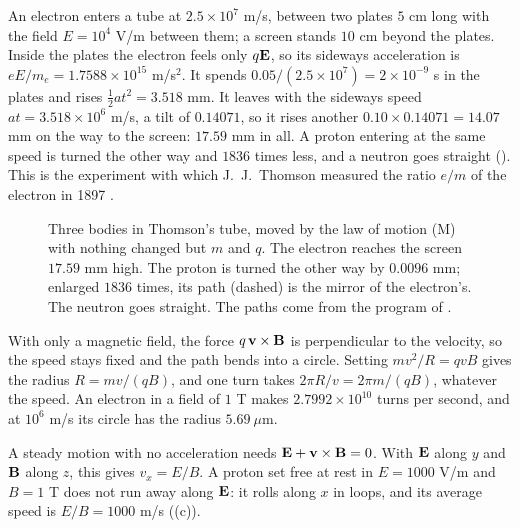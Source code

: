 \begin{workedexample}
An electron enters a tube at $2.5 \times 10^7$ m/s, between two plates $5$ cm long with the field $E = 10^4$ V/m between them; a screen stands $10$ cm beyond the plates. Inside the plates the electron feels only $q\mathbf{E}$, so its sideways acceleration is $eE/m_e = 1.7588 \times 10^{15}$ m/s$^2$. It spends $0.05/(2.5 \times 10^7) = 2 \times 10^{-9}$ s in the plates and rises $\tfrac12 a t^2 = 3.518$ mm. It leaves with the sideways speed $at = 3.518 \times 10^6$ m/s, a tilt of $0.14071$, so it rises another $0.10 \times 0.14071 = 14.07$ mm on the way to the screen: $17.59$ mm in all. A proton entering at the same speed is turned the other way and $1836$ times less, and a neutron goes straight (). This is the experiment with which J.~J.~Thomson measured the ratio $e/m$ of the electron in 1897 \citep{Thomson1897}.
\end{workedexample}

\begin{figure}[tb]
\myfloatalign

\caption[Three bodies in Thomson's tube]{Three bodies in Thomson's tube, moved by the law of motion (M) with nothing changed but $m$ and $q$. The electron reaches the screen $17.59$ mm high. The proton is turned the other way by $0.0096$ mm; enlarged $1836$ times, its path (dashed) is the mirror of the electron's. The neutron goes straight. The paths come from the program of .}
\label{fig:un-thomson}
\end{figure}

\begin{workedexample}
With only a magnetic field, the force $q\,\mathbf{v}\times\mathbf{B}$ is perpendicular to the velocity, so the speed stays fixed and the path bends into a circle. Setting $mv^2/R = qvB$ gives the radius $R = mv/(qB)$, and one turn takes $2\pi R/v = 2\pi m/(qB)$, whatever the speed. An electron in a field of $1$ T makes $2.7992 \times 10^{10}$ turns per second, and at $10^6$ m/s its circle has the radius $5.69\ \mu$m.
\end{workedexample}

\begin{workedexample}
A steady motion with no acceleration needs $\mathbf{E} + \mathbf{v}\times\mathbf{B} = 0$. With $\mathbf{E}$ along $y$ and $\mathbf{B}$ along $z$, this gives $v_x = E/B$. A proton set free at rest in $E = 1000$ V/m and $B = 1$ T does not run away along $\mathbf{E}$: it rolls along $x$ in loops, and its average speed is $E/B = 1000$ m/s ((c)).
\end{workedexample}


